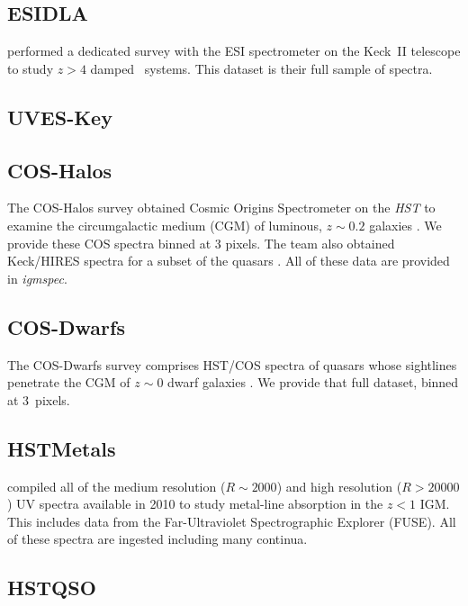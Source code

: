 \documentclass[12pt]{elsarticle}
\begin{document}
\subsection{ESIDLA}
\label{sec:esidla}

\cite{rafelski+12,rafelski+14} performed a dedicated survey
with the ESI spectrometer \citep{sbe+02} on the Keck~II telescope
to study $z>4$ damped \lya\ systems.  This dataset is their
full sample of spectra.

\subsection{UVES-Key}

\subsection{COS-Halos}
\label{sec:cos-halos}

The COS-Halos survey obtained Cosmic Origins Spectrometer 
\citep[COS;][]{cos} on the {\it HST}
to examine the circumgalactic medium (CGM) of luminous,
$z \sim 0.2$ galaxies \citep{tumlinson+13}.
We provide these COS spectra binned at 3 pixels.
The team also obtained Keck/HIRES spectra for a subset of the
quasars \citep{werk+13}.
All of these data are provided in {\it igmspec}.

\subsection{COS-Dwarfs}
\label{sec:cos-dwarfs}

The COS-Dwarfs survey comprises HST/COS spectra
of quasars whose sightlines penetrate the CGM of
$z \sim 0$ dwarf galaxies \citep{bordoloi14}.
We provide that full dataset, binned at 3~pixels.

\subsection{HSTMetals}
\label{sec:hstmetals}

\cite{ctp+10,cpt+11} compiled all of the medium
resolution ($R \sim 2000$) and high resolution
($R > 20000$) UV spectra available in 2010 to
study metal-line absorption in the $z<1$ IGM.
This includes data from the Far-Ultraviolet 
Spectrographic Explorer (FUSE).
All of these spectra are ingested including many
continua.


\subsection{HSTQSO}
\label{sec:hstqso}
\end{document}
